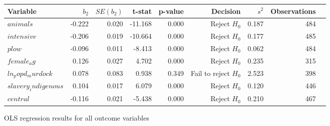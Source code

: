\centering
\begin{tabular}{lrrrrrrrl}
\hline
Variable & $b_2$ & $SE(b_2)$ & t-stat & p-value & Decision & $s^2$ & Observations \\
\hline
$animals$ & -0.222 & 0.020 & -11.168 & 0.000 & Reject $H_0$ & 0.187 & 484\\
$intensive$ & -0.206 & 0.019 & -10.664 & 0.000 & Reject $H_0$ & 0.177 & 485\\
$plow$ & -0.096 & 0.011 & -8.413 & 0.000 & Reject $H_0$ & 0.062 & 484\\
$female_ag$ & 0.126 & 0.027 & 4.702 & 0.000 & Reject $H_0$ & 0.235 & 315\\
$ln_popd_murdock$ & 0.078 & 0.083 & 0.938 & 0.349 & Fail to reject $H_0$ & 2.523 & 398\\
$slavery_indigenous$ & 0.104 & 0.017 & 6.079 & 0.000 & Reject $H_0$ & 0.120 & 446\\
$central$ & -0.116 & 0.021 & -5.438 & 0.000 & Reject $H_0$ & 0.210 & 467\\
\hline
\end{tabular}
\caption{OLS regression results for all outcome variables}
\label{tab:regression_results}
